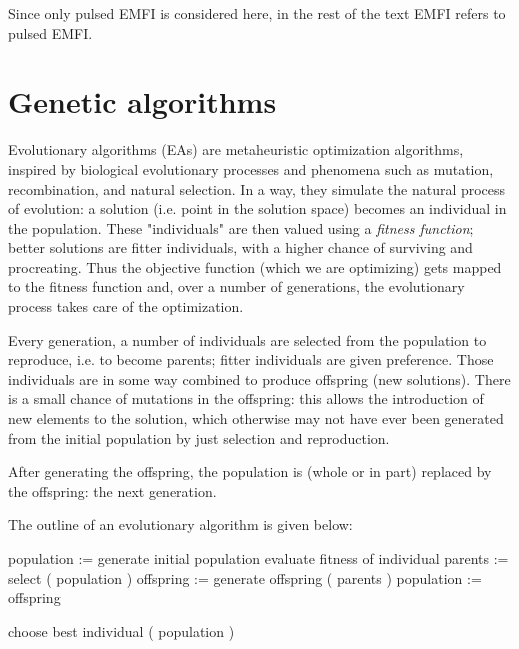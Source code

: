 \documentclass[times, utf8, diplomski]{fer}
\begin{document}
Since only pulsed EMFI is considered here, in the rest of the text EMFI refers
to pulsed EMFI.


\section{Genetic algorithms}\label{sec:GAs}
Evolutionary algorithms (EAs) are metaheuristic optimization algorithms,
inspired by biological evolutionary processes and phenomena such as mutation,
recombination, and natural selection.
In a way, they simulate the natural process of evolution: a solution
(i.e. point in the solution space) becomes an individual in the population.
These "individuals" are then valued using a \emph{fitness function}; better
solutions are fitter individuals, with a higher chance of surviving and procreating.
Thus the objective function (which we are optimizing) gets mapped to the fitness function
and, over a number of generations, the evolutionary process takes care of the optimization.

Every generation, a number of individuals are selected from the population to
reproduce, i.e. to become parents; fitter individuals are given preference.
Those individuals are in some way combined to produce offspring (new solutions).
There is a small chance of mutations in the offspring: this allows the introduction
of new elements to the solution, which otherwise may not have ever been generated
from the initial population by just selection and reproduction.

After generating the offspring, the population is (whole or in part) replaced
by the offspring: the next generation.

The outline of an evolutionary algorithm is given below:
\begin{algorithm}[h]\label{algo:evolutionary}
    \begin{algorithmic}
        \STATE population := generate initial population
        \REPEAT
                \STATE evaluate fitness of individual
            \ENDFOR
            \STATE parents    := select ( population )
            \STATE offspring  := generate offspring ( parents )
            \STATE population := offspring


        \RETURN choose best individual ( population )
    \end{algorithmic}
\end{algorithm}
\end{document}
